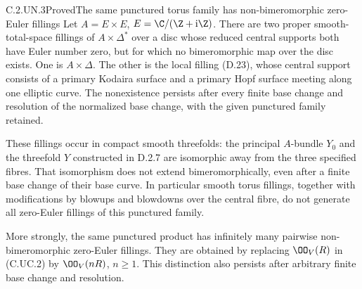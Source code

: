 \begin{statement}{C.2.UN.3}{Proved}{The same punctured torus family has non-bimeromorphic zero-Euler fillings}
Let $A=E\times E$, $E=\C/(\Z+\mathrm i\Z)$.
There are two proper smooth-total-space fillings of
$A\times\Delta^*$ over a disc whose reduced central
supports both have Euler number zero, but for which
no bimeromorphic map over the disc exists. One is
$A\times\Delta$. The other is the local filling
(D.23), whose central support consists of a primary
Kodaira surface and a primary Hopf surface meeting
along one elliptic curve. The nonexistence persists
after every finite base change and resolution of the
normalized base change, with the given punctured
family retained.

These fillings occur in compact smooth threefolds:
the principal $A$-bundle $Y_0$ and the threefold $Y$
constructed in D.2.7 are isomorphic away from the
three specified fibres. That isomorphism does not
extend bimeromorphically, even after a finite base
change of their base curve. In particular smooth
torus fillings, together with modifications by
blowups and blowdowns over the central fibre, do
not generate all zero-Euler fillings of this
punctured family.

More strongly, the same punctured product has
infinitely many pairwise non-bimeromorphic
zero-Euler fillings. They are obtained by replacing
$\OO_V(R)$ in (C.UC.2) by $\OO_V(nR)$,
$n\ge1$. This distinction also persists after
arbitrary finite base change and resolution.
\end{statement}
